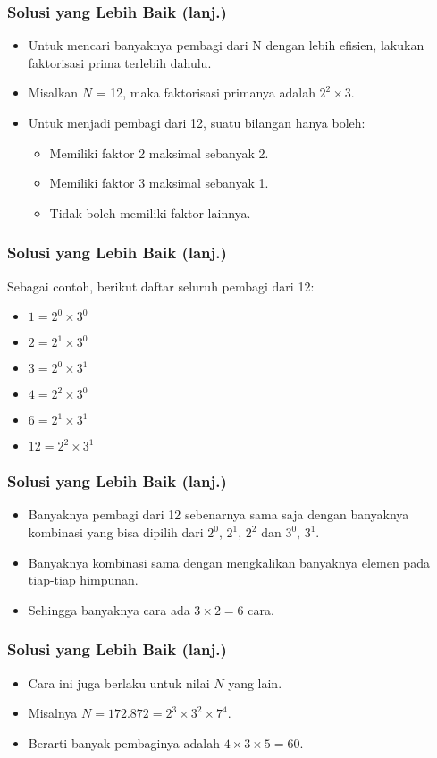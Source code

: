 \begin{frame}
\frametitle{Solusi yang Lebih Baik (lanj.)}
\begin{itemize}
  \item Untuk mencari banyaknya pembagi dari N dengan lebih efisien, lakukan faktorisasi prima terlebih dahulu.
  \item Misalkan $N$ = 12, maka faktorisasi primanya adalah $2^2 \times 3$.
  \newline
  \item Untuk menjadi pembagi dari 12, suatu bilangan hanya boleh:
  \begin{itemize}
    \item Memiliki faktor 2 maksimal sebanyak 2.
    \item Memiliki faktor 3 maksimal sebanyak 1.
    \item Tidak boleh memiliki faktor lainnya.
  \end{itemize}
\end{itemize}
\end{frame}

\begin{frame}
\frametitle{Solusi yang Lebih Baik (lanj.)}
Sebagai contoh, berikut daftar seluruh pembagi dari 12:
\begin{itemize}
  \item $1 = 2^0 \times 3^0$
  \item $2 = 2^1 \times 3^0$
  \item $3 = 2^0 \times 3^1$
  \item $4 = 2^2 \times 3^0$
  \item $6 = 2^1 \times 3^1$
  \item $12 = 2^2 \times 3^1$
\end{itemize}
\end{frame}

\begin{frame}
\frametitle{Solusi yang Lebih Baik (lanj.)}
\begin{itemize}
  \item Banyaknya pembagi dari 12 sebenarnya sama saja dengan banyaknya kombinasi yang bisa dipilih dari {$2^0$, $2^1$, $2^2$} dan {$3^0$, $3^1$}.
  \item Banyaknya kombinasi sama dengan mengkalikan banyaknya elemen pada tiap-tiap himpunan.
  \item Sehingga banyaknya cara ada $3 \times 2 = 6$ cara.
\end{itemize}
\end{frame}

\begin{frame}
\frametitle{Solusi yang Lebih Baik (lanj.)}
\begin{itemize}
  \item Cara ini juga berlaku untuk nilai $N$ yang lain.
  \item Misalnya $N = 172.872 = 2^3 \times 3^2 \times 7^4$.
  \item Berarti banyak pembaginya adalah $4 \times 3 \times 5 = 60$.
\end{itemize}
\end{frame}

